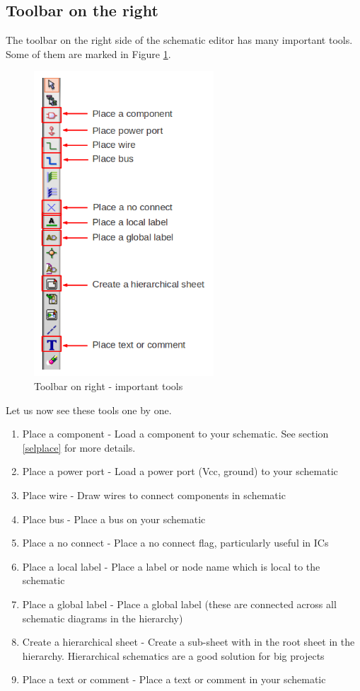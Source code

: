 \subsection{Toolbar on the right}
The toolbar on the right side of the schematic editor has many important tools. Some of them are marked in Figure \ref{eeschem3}.
\begin{figure}
\centering
\includegraphics[width=0.6\textwidth]{figures/eeschema3_mod}
\caption{Toolbar on right - important tools}
\label{eeschem3}
\end{figure}

Let us now see these tools one by one.
\begin{enumerate}
\item Place a component - Load a component to your schematic. See section \ref{selplace} for more details.
\item Place a power port - Load a power port (Vcc, ground) to your schematic
\item Place wire - Draw wires to connect components in schematic
\item Place bus - Place a bus on your schematic
\item Place a no connect - Place a no connect flag, particularly useful in ICs
\item Place a local label - Place a label or node name which is local to the schematic
\item Place a global label - Place a global label (these are connected across all schematic diagrams in the hierarchy)
\item Create a hierarchical sheet - Create a sub-sheet with in the root sheet in the hierarchy. Hierarchical schematics are a good solution for big projects
\item Place a text or comment - Place a text or comment in your schematic
\end{enumerate}
